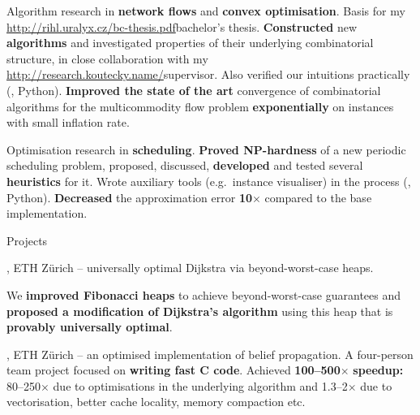 
%
\: Algorithm research in {\bf network flows} and {\bf convex optimisation}. Basis for my \url{http://rihl.uralyx.cz/bc-thesis.pdf}{bachelor's thesis}.
\: {\bf Constructed} new {\bf algorithms} and investigated properties of their underlying combinatorial structure, in close collaboration with my
\url{http://research.koutecky.name/}{supervisor}. Also verified our intuitions practically (\Cpp, Python).
\: {\bf Improved the state of the art} convergence of combinatorial
algorithms for the multicommodity flow problem {\bf exponentially}
on instances with small inflation rate.
%
%
\endlist

%
%
\: Optimisation research in {\bf scheduling}.
\: {\bf Proved NP-hardness} of a new periodic scheduling problem, proposed, discussed, {\bf
developed} and tested several {\bf heuristics} for it. Wrote auxiliary tools (e.g.~instance visualiser) in the process (\Cpp, Python).
\:
{\bf Decreased} the approximation error {\bf 10$\times$} compared to the base implementation.

\endlist

\sekce Projects

, {\I ETH Zürich} – universally optimal Dijkstra via beyond-worst-case heaps.

\: We {\bf improved Fibonacci heaps} to achieve beyond-worst-case guarantees and {\bf proposed a modification of Dijkstra's algorithm} using this heap that is {\bf provably universally optimal}.
\endlist

, {\I ETH Zürich} – an optimised implementation of belief propagation.
\: A four-person team project focused on {\bf writing fast C code}.
\: Achieved {\bf 100–500}$\times$ {\bf speedup:} 80–250$\times$ due to optimisations in the underlying algorithm and 1.3–2$\times$ due to vectorisation, better cache locality, memory compaction etc.
\endlist

